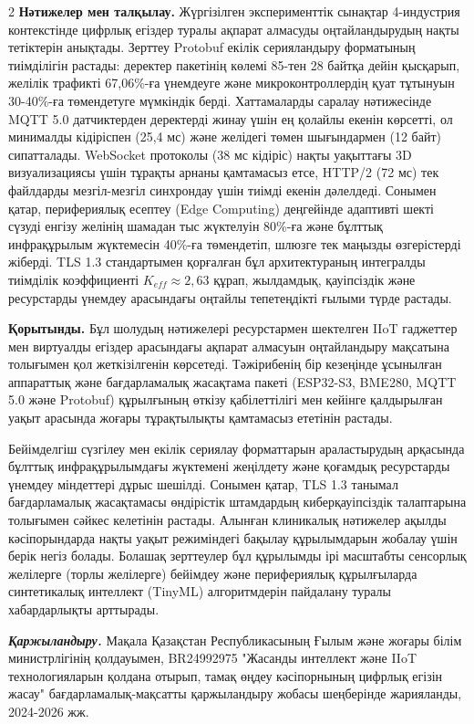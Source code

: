 \begin{multicols}{2}
{\bfseries Нәтижелер мен талқылау.} Жүргізілген эксперименттік сынақтар
4-индустрия контекстінде цифрлық егіздер туралы ақпарат алмасуды
оңтайландырудың нақты тетіктерін анықтады. Зерттеу Protobuf екілік
серияландыру форматының тиімділігін растады: деректер пакетінің көлемі
85-тен 28 байтқа дейін қысқарып, желілік трафикті 67,06\%-ға үнемдеуге
және микроконтроллердің қуат тұтынуын 30-40\%-ға төмендетуге мүмкіндік
берді. Хаттамаларды саралау нәтижесінде MQTT 5.0 датчиктерден деректерді
жинау үшін ең қолайлы екенін көрсетті, ол минималды кідіріспен (25,4 мс)
және желідегі төмен шығындармен (12 байт) сипатталады. WebSocket
протоколы (38 мс кідіріс) нақты уақыттағы 3D визуализациясы үшін тұрақты
арнаны қамтамасыз етсе, HTTP/2 (72 мс) тек файлдарды мезгіл-мезгіл
синхрондау үшін тиімді екенін дәлелдеді. Сонымен қатар, перифериялық
есептеу (Edge Computing) деңгейінде адаптивті шекті сүзуді енгізу
желінің шамадан тыс жүктелуін 80\%-ға және бұлттық инфрақұрылым
жүктемесін 40\%-ға төмендетіп, шлюзге тек маңызды өзгерістерді жіберді.
TLS 1.3 стандартымен қорғалған бұл архитектураның интегралды тиімділік
коэффициенті \(K_{eff} \approx 2,63\) құрап, жылдамдық, қауіпсіздік және
ресурстарды үнемдеу арасындағы оңтайлы тепетеңдікті ғылыми түрде растады.

{\bfseries Қорытынды.} Бұл шолудың нәтижелері ресурстармен шектелген IIoT
гаджеттер мен виртуалды егіздер арасындағы ақпарат алмасуын оңтайландыру
мақсатына толығымен қол жеткізілгенін көрсетеді. Тәжірибенің бір
кезеңінде ұсынылған аппараттық және бағдарламалық жасақтама пакеті
(ESP32-S3, BME280, MQTT 5.0 және Protobuf) құрылғының өткізу
қабілеттілігі мен кейінге қалдырылған уақыт арасында жоғары тұрақтылықты
қамтамасыз ететінін растады.

Бейімделгіш сүзгілеу мен екілік сериялау форматтарын араластырудың
арқасында бұлттық инфрақұрылымдағы жүктемені жеңілдету және қоғамдық
ресурстарды үнемдеу міндеттері дұрыс шешілді. Сонымен қатар, TLS 1.3
танымал бағдарламалық жасақтамасы өндірістік штамдардың киберқауіпсіздік
талаптарына толығымен сәйкес келетінін растады. Алынған клиникалық
нәтижелер ақылды кәсіпорындарда нақты уақыт режиміндегі бақылау
құрылымдарын жобалау үшін берік негіз болады. Болашақ зерттеулер бұл
құрылымды ірі масштабты сенсорлық желілерге (торлы желілерге) бейімдеу
және перифериялық құрылғыларда синтетикалық интеллект (TinyML)
алгоритмдерін пайдалану туралы хабардарлықты арттырады.

\emph{{\bfseries Қаржыландыру.}} Мақала Қазақстан Республикасының Ғылым
және жоғары білім министрлігінің қолдауымен, BR24992975 "Жасанды
интеллект және IIoT технологияларын қолдана отырып, тамақ өңдеу
кәсіпорнының цифрлық егізін жасау" бағдарламалық-мақсатты қаржыландыру
жобасы шеңберінде жарияланды, 2024-2026 жж.
\end{multicols}

